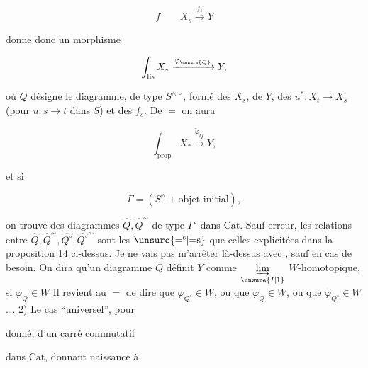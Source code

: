 \[
f\qquad X_s\xrightarrow{f_s}Y
\]

donne donc un morphisme

\[
\int_{\mathrm{lis}}X_*\xrightarrow{\varphi_{\unsure{Q}}}Y,
\]

où $Q$ désigne le diagramme, de type $S^{\wedge\,\circ}$, formé des $X_s$, de $Y$, des $u^*:X_t\to X_s$ (pour $u:s\to t$ dans $S$) et des $f_s$. De $=$ on aura

\[
\int_{\mathrm{prop}}X_*\xrightarrow{\widetilde\varphi_Q}Y,
\]

et si

\[
\Gamma=(S^\wedge+\text{objet initial}),
\]

on trouve des diagrammes $\widehat Q,\widehat Q^{\sim}$ de type $\Gamma^\circ$ dans $\mathrm{Cat}$. Sauf erreur, les relations entre $\widehat Q,\widehat Q^{\sim},\widehat{Q^\circ},\widehat{Q^\circ}^{\sim}$ sont les $\unsure{{=}^{\mathrm s}|{=}\mathrm s}$ que celles explicitées dans la proposition 14 ci-dessus. Je ne vais pas m'arrêter là-dessus avec , sauf en cas de besoin. On dira qu'un diagramme $Q$ définit $Y$ comme $\underset{\unsure{I|1}}{\varinjlim}$ $W$-homotopique, si $\varphi_Q\in W$ Il revient au $=$ de dire que $\varphi_{Q^\circ}\in W$, ou que $\widetilde\varphi_Q\in W$, ou que $\widetilde\varphi_{Q^\circ}\in W$\ldots.
2) Le cas ``universel'', pour


donné, d'un carré commutatif


dans $\mathrm{Cat}$, donnant naissance à


